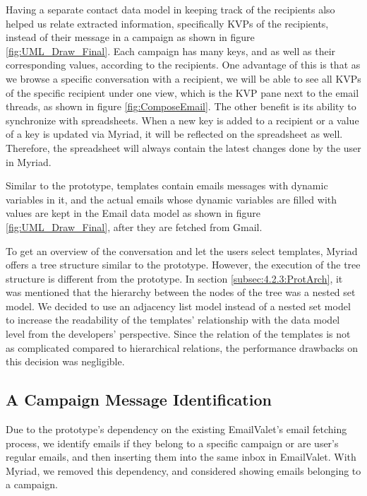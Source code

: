 Having a separate contact data model in keeping track of the recipients also helped us relate extracted information, specifically \ac{KVP}s of the recipients, instead of their message in a campaign as shown in figure \ref{fig:UML_Draw_Final}. Each campaign has many keys, and as well as their corresponding values, according to the recipients. One advantage of this is that as we browse a specific conversation with a recipient, we will be able to see all \ac{KVP}s of the specific recipient under one view, which is the \ac{KVP} pane next to the email threads, as shown in figure \ref{fig:ComposeEmail}. The other benefit is its ability to synchronize with spreadsheets. When a new key is added to a recipient or a value of a key is updated via Myriad, it will be reflected on the spreadsheet as well. Therefore, the spreadsheet will always contain the latest changes done by the user in Myriad. 
\vspace{1cm}

Similar to the prototype, templates contain emails messages with dynamic variables in it, and the actual emails whose dynamic variables are filled with values are kept in the Email data model as shown in figure \ref{fig:UML_Draw_Final}, after they are fetched from Gmail.
\vspace{1cm}

To get an overview of the conversation and let the users select templates, Myriad offers a tree structure similar to the prototype. However, the execution of the tree structure is different from the prototype. In section \ref{subsec:4.2.3:ProtArch}, it was mentioned that the hierarchy between the nodes of the tree was a nested set model. We decided to use an adjacency list model instead of a nested set model to increase the readability of the templates' relationship with the data model level from the developers' perspective. Since the relation of the templates is not as complicated compared to hierarchical relations, the performance drawbacks on this decision was negligible.

\subsection{A Campaign Message Identification}
\label{subsec:5.3.3:MessIden}

Due to the prototype's dependency on the existing EmailValet's email fetching process, we identify emails if they belong to a specific campaign or are user's regular emails, and then inserting them into the same inbox in EmailValet. With Myriad, we removed this dependency, and considered showing emails belonging to a campaign.
\vspace{1cm}

